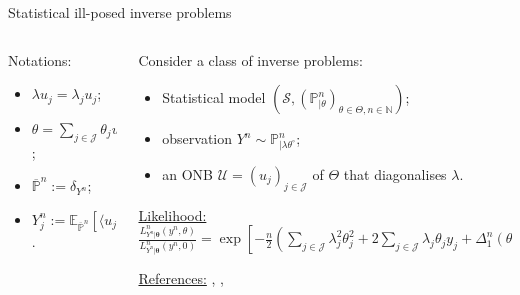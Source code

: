 \documentclass[10pt]{beamer}
\begin{document}
\begin{frame}{Statistical ill-posed inverse problems}
\begin{columns}
\begin{column}[T]{.3\textwidth}%
\bigskip
\begin{block}{Notations:}
\begin{itemize}
\setlength\itemsep{2em}
\item $\lambda u_{j} = \lambda_{j} u_{j}$;
\item $\theta = \sum\limits_{j \in \mathcal{J}} \theta_{j} u_{j}$;
\item $\overline{\mathbb{P}}^{n}:= \delta_{Y^{n}}$;
\item $Y^{n}_{j}:= \mathbb{E}_{\overline{\mathbb{P}}^{n}}[\langle u_{j} \vert Y^{n} \rangle]$.
\end{itemize}
\end{block}
\end{column}

\begin{column}[T]{.8\textwidth}%

\bigskip

Consider a class of inverse problems:
\begin{itemize}
\item Statistical model $\left(\mathcal{S}, \left(\mathbb{P}_{\vert \theta}^{n}\right)_{\theta \in \Theta, n \in \mathbb{N}}\right)$;
\item observation $Y^{n} \sim \mathbb{P}_{\vert \lambda \theta^{\circ}}^{n}$;
\item an ONB $\mathcal{U} = \left(u_{j}\right)_{j \in \mathcal{J}}$ of $\Theta$ that diagonalises $\lambda$.
\end{itemize}

\bigskip
\bigskip

\underline{Likelihood:} $\frac{L_{Y^{n} \vert \boldsymbol{\theta}}^{n}(y^{n}, \theta)}{L_{Y^{n} \vert \boldsymbol{\theta}}^{n}(y^{n}, 0)} = \exp\left[-\frac{n}{2}\left(\sum\limits_{j \in \mathcal{J}} \lambda_{j}^{2}\theta_{j}^{2} + 2 \sum\limits_{j \in \mathcal{J}}\lambda_{j} \theta_{j} y_{j} + \Delta_{1}^{n}(\theta, y^{n})\right)\right]$

\bigskip
\bigskip

\underline{References:} \textsc{\citet{HEMHAN}}, \textsc{\citet{cavalier2011inverse}}, \textsc{\citet{doi:10.1121/1.3685484}}
\end{column}
\end{columns}
\end{frame}
\end{document}

